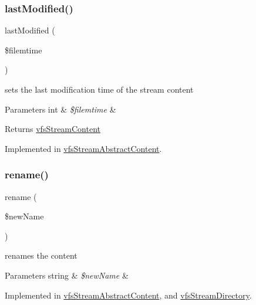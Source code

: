 \subsubsection{\texorpdfstring{last\+Modified()}{lastModified()}}
{\footnotesize\ttfamily last\+Modified (\begin{DoxyParamCaption}\item[{}]{\$filemtime }\end{DoxyParamCaption})}

sets the last modification time of the stream content


\begin{DoxyParams}[1]{Parameters}
int & {\em \$filemtime} & \\
\hline
\end{DoxyParams}
\begin{DoxyReturn}{Returns}
\mbox{\hyperlink{interfaceorg_1_1bovigo_1_1vfs_1_1vfs_stream_content}{vfs\+Stream\+Content}} 
\end{DoxyReturn}


Implemented in \mbox{\hyperlink{classorg_1_1bovigo_1_1vfs_1_1vfs_stream_abstract_content_ae862e04a845949a0d2bf4cada6a06ac4}{vfs\+Stream\+Abstract\+Content}}.

\mbox{\label{interfaceorg_1_1bovigo_1_1vfs_1_1vfs_stream_content_ab40397a8b5cf98ff82734ce7b1276363}} 
\subsubsection{\texorpdfstring{rename()}{rename()}}
{\footnotesize\ttfamily rename (\begin{DoxyParamCaption}\item[{}]{\$new\+Name }\end{DoxyParamCaption})}

renames the content


\begin{DoxyParams}[1]{Parameters}
string & {\em \$new\+Name} & \\
\hline
\end{DoxyParams}


Implemented in \mbox{\hyperlink{classorg_1_1bovigo_1_1vfs_1_1vfs_stream_abstract_content_ab40397a8b5cf98ff82734ce7b1276363}{vfs\+Stream\+Abstract\+Content}}, and \mbox{\hyperlink{classorg_1_1bovigo_1_1vfs_1_1vfs_stream_directory_ab40397a8b5cf98ff82734ce7b1276363}{vfs\+Stream\+Directory}}.

